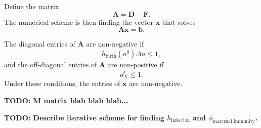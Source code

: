 \documentclass[12pt]{article}
\renewcommand{\vec}[1]{\mathbf{#1}}
\newcommand{\mat}[1]{\mathbf{#1}}
\begin{document}
Define the matrix
\begin{equation}
  \mat{A} =
  \mat{D} - \mat{F}.
\end{equation}
The numerical scheme is then finding the vector $\vec{x}$ that solves
\begin{equation}
  \mat{A} \vec{x} = \vec{b}.
\end{equation}

The diagonal entries of $\mat{A}$ are non-negative if
\begin{equation}
  h_{\text{birth}}(a^0) \Delta a \leq 1,
\end{equation}
and the off-diagonal entries of $\mat{A}$ are non-positive if
\begin{equation}
  d_X^i \leq 1.
\end{equation}
Under these conditions, the entries of $\vec{x}$ are non-negative.

\textbf{TODO: M matrix blah blah blah...}

\textbf{TODO: Describe iterative scheme for finding
  $h_{\text{infection}}$ and $\phi_{\text{maternal immunity}}$.}




\end{document}
